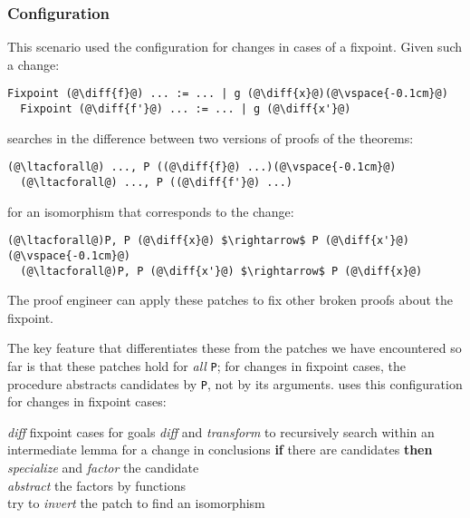 \subsubsection{Configuration}

This scenario used the configuration for changes in cases of a fixpoint.
Given such a change:

\begin{lstlisting}[language=coq]
  Fixpoint (@\diff{f}@) ... := ... | g (@\diff{x}@)(@\vspace{-0.1cm}@)
  Fixpoint (@\diff{f'}@) ... := ... | g (@\diff{x'}@)
\end{lstlisting}
\sysname searches in the difference between two versions of proofs of the theorems:

\begin{lstlisting}[language=coq]
  (@\ltacforall@) ..., P ((@\diff{f}@) ...)(@\vspace{-0.1cm}@)
  (@\ltacforall@) ..., P ((@\diff{f'}@) ...)
\end{lstlisting}
for an isomorphism that corresponds to the change:

\begin{lstlisting}[language=coq]
  (@\ltacforall@)P, P (@\diff{x}@) $\rightarrow$ P (@\diff{x'}@)(@\vspace{-0.1cm}@)
  (@\ltacforall@)P, P (@\diff{x'}@) $\rightarrow$ P (@\diff{x}@)
\end{lstlisting}
The proof engineer can apply these patches to fix other broken proofs about the fixpoint.

The key feature that differentiates these from the patches we have encountered so far is that
these patches hold for \emph{all} \lstinline{P}; for changes in fixpoint cases, the procedure abstracts
candidates by \lstinline{P}, not by its arguments.
\sysname uses this configuration for changes in fixpoint cases:

\begin{algorithm}
\footnotesize
\begin{algorithmic}[1]
    \STATE \textit{diff} fixpoint cases for goals
    \STATE \textit{diff} and \textit{transform} to recursively search within an intermediate lemma for a change in conclusions
    \STATE \textbf{if} there are candidates \textbf{then}
    \STATE \hspace*{1em} \textit{specialize} and \textit{factor} the candidate \\
           \hspace*{1em} \textit{abstract} the factors by functions \\
           \hspace*{1em} try to \textit{invert} the patch to find an isomorphism 
\end{algorithmic}
\end{algorithm}

